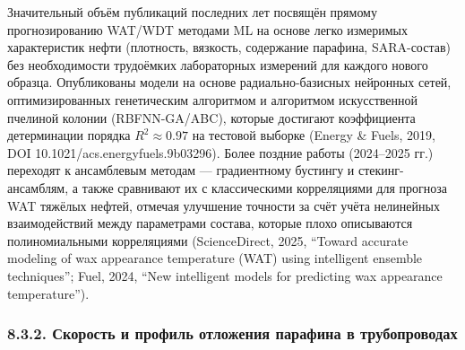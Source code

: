 \documentclass[11pt]{extarticle}
\begin{document}
Значительный объём публикаций последних лет посвящён прямому прогнозированию WAT/WDT методами ML на основе легко измеримых характеристик нефти (плотность, вязкость, содержание парафина, SARA-состав) без необходимости трудоёмких лабораторных измерений для каждого нового образца. Опубликованы модели на основе радиально-базисных нейронных сетей, оптимизированных генетическим алгоритмом и алгоритмом искусственной пчелиной колонии (RBFNN-GA/ABC), которые достигают коэффициента детерминации порядка \(R^2 \approx 0.97\) на тестовой выборке (Energy \& Fuels, 2019, DOI 10.1021/acs.energyfuels.9b03296). Более поздние работы (2024--2025 гг.) переходят к ансамблевым методам --- градиентному бустингу и стекинг-ансамблям, а также сравнивают их с классическими корреляциями для прогноза WAT тяжёлых нефтей, отмечая улучшение точности за счёт учёта нелинейных взаимодействий между параметрами состава, которые плохо описываются полиномиальными корреляциями (ScienceDirect, 2025, ``Toward accurate modeling of wax appearance temperature (WAT) using intelligent ensemble techniques''; Fuel, 2024, ``New intelligent models for predicting wax appearance temperature'').

\subsubsection{8.3.2. Скорость и профиль отложения парафина в трубопроводах}\label{ux441ux43aux43eux440ux43eux441ux442ux44c-ux438-ux43fux440ux43eux444ux438ux43bux44c-ux43eux442ux43bux43eux436ux435ux43dux438ux44f-ux43fux430ux440ux430ux444ux438ux43dux430-ux432-ux442ux440ux443ux431ux43eux43fux440ux43eux432ux43eux434ux430ux445}
\end{document}
